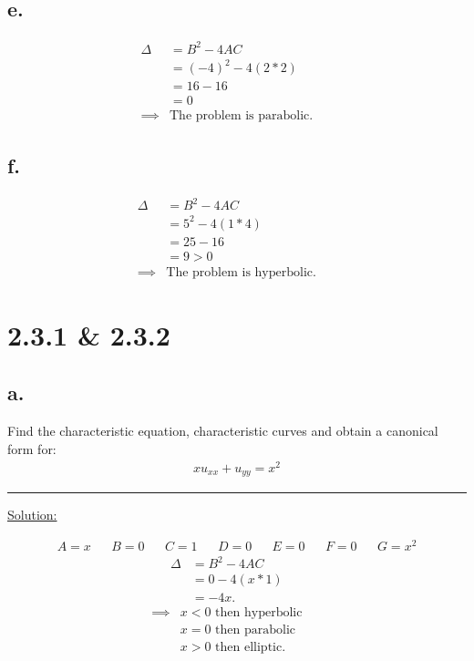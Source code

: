 \documentclass{article}
\begin{document}
\subsection*{e.}
\begin{align*}
  \Delta &= B^2 - 4AC &&\\
  &= (-4)^2 - 4(2*2) &&\\
  &= 16 - 16 &&\\
  &= 0 &&\\
  \implies& \text{The problem is parabolic.}
\end{align*}

\subsection*{f.}
\begin{align*}
  \Delta &= B^2 - 4AC &&\\
  &= 5^2 - 4(1*4) &&\\
  &= 25 - 16 &&\\
  &= 9 > 0 &&\\
  \implies& \text{The problem is hyperbolic.}
\end{align*}

\newpage

\section*{2.3.1 \& 2.3.2 }
\subsection*{a.}
Find the characteristic equation, characteristic curves and obtain a canonical form for:
\begin{align*}
  x u_{xx} + u_{yy} = x^2
\end{align*}

\begin{center}
  \noindent\rule{8cm}{0.4pt}
\end{center}

\underline{Solution:}

\begin{align*}
  A=x && B=0 && C=1 && D=0 && E=0 && F=0 && G=x^2  
\end{align*}
\begin{align*}
  \Delta &= B^2 - 4AC &&\\
  &= 0 - 4(x*1) &&\\
  &= -4x.
\end{align*}
\begin{align*}
  \implies& x < 0 \text{ then hyperbolic} &&\\
  & x = 0 \text{ then parabolic} &&\\
  & x > 0 \text{ then elliptic}.
\end{align*}
\end{document}
